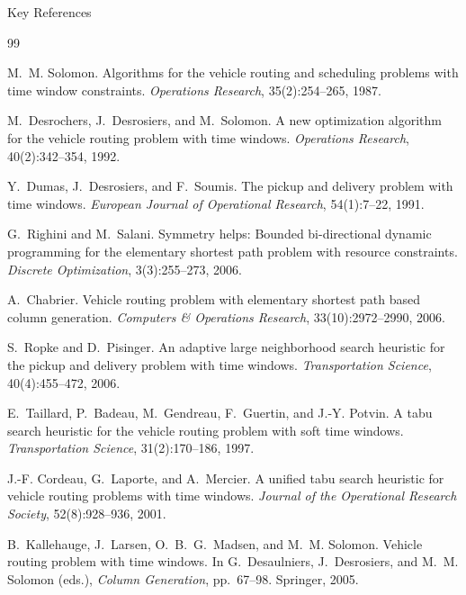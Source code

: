 \documentclass[aspectratio=169,10pt]{beamer}
\begin{document}
\begin{frame}[allowframebreaks]{Key References}

\begin{thebibliography}{99}
\small

  M.~M. Solomon.
  \newblock Algorithms for the vehicle routing and scheduling problems with time
    window constraints.
  \newblock \textit{Operations Research}, 35(2):254--265, 1987.

  M.~Desrochers, J.~Desrosiers, and M.~Solomon.
  \newblock A new optimization algorithm for the vehicle routing problem with
    time windows.
  \newblock \textit{Operations Research}, 40(2):342--354, 1992.

  Y.~Dumas, J.~Desrosiers, and F.~Soumis.
  \newblock The pickup and delivery problem with time windows.
  \newblock \textit{European Journal of Operational Research}, 54(1):7--22, 1991.

  G.~Righini and M.~Salani.
  \newblock Symmetry helps: Bounded bi-directional dynamic programming for the
    elementary shortest path problem with resource constraints.
  \newblock \textit{Discrete Optimization}, 3(3):255--273, 2006.

  A.~Chabrier.
  \newblock Vehicle routing problem with elementary shortest path based column
    generation.
  \newblock \textit{Computers \& Operations Research}, 33(10):2972--2990, 2006.

  S.~Ropke and D.~Pisinger.
  \newblock An adaptive large neighborhood search heuristic for the pickup and
    delivery problem with time windows.
  \newblock \textit{Transportation Science}, 40(4):455--472, 2006.

  E.~Taillard, P.~Badeau, M.~Gendreau, F.~Guertin, and J.-Y. Potvin.
  \newblock A tabu search heuristic for the vehicle routing problem with soft
    time windows.
  \newblock \textit{Transportation Science}, 31(2):170--186, 1997.

  J.-F. Cordeau, G.~Laporte, and A.~Mercier.
  \newblock A unified tabu search heuristic for vehicle routing problems with
    time windows.
  \newblock \textit{Journal of the Operational Research Society}, 52(8):928--936,
    2001.

  B.~Kallehauge, J.~Larsen, O.~B.~G.~Madsen, and M.~M. Solomon.
  \newblock Vehicle routing problem with time windows.
  \newblock In G.~Desaulniers, J.~Desrosiers, and M.~M. Solomon (eds.),
    \textit{Column Generation}, pp.~67--98. Springer, 2005.


\end{thebibliography}
\end{frame}
\end{document}
